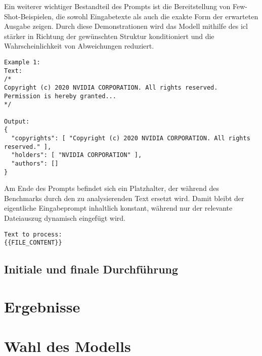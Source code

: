 Ein weiterer wichtiger Bestandteil des Prompts ist die Bereitstellung von Few-Shot-Beispielen, die sowohl Eingabetexte als auch die exakte Form der erwarteten Ausgabe zeigen.
Durch diese Demonstrationen wird das Modell mithilfe des \gls{icl} stärker in Richtung der gewünschten Struktur konditioniert und die Wahrscheinlichkeit von Abweichungen reduziert.

\begin{lstlisting}[keepspaces=true]
Example 1:
Text:
/*
Copyright (c) 2020 NVIDIA CORPORATION. All rights reserved.
Permission is hereby granted...
*/

Output:
{
  "copyrights": [ "Copyright (c) 2020 NVIDIA CORPORATION. All rights reserved." ],
  "holders": [ "NVIDIA CORPORATION" ],
  "authors": []
}
\end{lstlisting}

Am Ende des Prompts befindet sich ein Platzhalter, der während des Benchmarks durch den zu analysierenden Text ersetzt wird.
Damit bleibt der eigentliche Eingabeprompt inhaltlich konstant, während nur der relevante Dateiauszug dynamisch eingefügt wird.

\begin{lstlisting}[keepspaces=true]
Text to process:
{{FILE_CONTENT}}
\end{lstlisting}


\subsection{Initiale und finale Durchführung}




\section{Ergebnisse}\label{sec:ergebnisse-benchmark}



\section{Wahl des Modells}\label{sec:auswahl-modell-benchmark}
